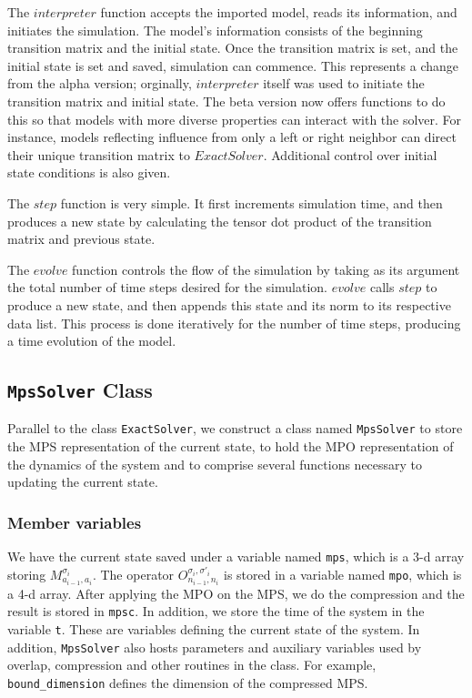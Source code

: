 \documentclass[english]{article}
\begin{document}
The $interpreter$ function accepts the imported model, reads its information, and initiates the simulation. The model's information consists of the beginning transition matrix and the initial state. Once the transition matrix is set, and the initial state is set and saved, simulation can commence. This represents a change from the alpha version; orginally, $interpreter$ itself was used to initiate the transition matrix and initial state. The beta version now offers functions to do this so that models with more diverse properties can interact with the solver. For instance, models reflecting influence from only a left or right neighbor can direct their unique transition matrix to $ExactSolver$. Additional control over initial state conditions is also given.

The $step$ function is very simple. It first increments simulation time, and then produces a new state by calculating the tensor dot product of the transition matrix and previous state.

The $evolve$ function controls the flow of the simulation by taking as its argument the total number of time steps desired for the simulation. $evolve$ calls $step$ to produce a new state, and then appends this state and its norm to its respective data list. This process is done iteratively for the number of time steps, producing a time evolution of the model. 


\subsection{\texttt{MpsSolver} Class}
Parallel to the class \texttt{ExactSolver}, we construct a class named \texttt{MpsSolver} to store the MPS representation of the current state, to hold the MPO representation of the dynamics of the system and to comprise several functions necessary to updating the current state. 
\subsubsection{Member variables}
We have the current state saved under a variable named \texttt{mps}, which is a 3-d array storing $M^{\sigma_i}_{a_{i-1},a_i}$. The operator $O^{\sigma_i, \sigma'_i}_{n_{i-1}, n_i}$ is stored in a variable named \texttt{mpo}, which is a 4-d array. After applying the MPO on the MPS, we do the compression and the result is stored in \texttt{mpsc}. In addition, we store the time of the system in the variable \texttt{t}. These are variables defining the current state of the system. In addition, \texttt{MpsSolver} also hosts parameters and auxiliary variables used by overlap, compression and other routines in the class. For example, \texttt{bound\_dimension} defines the dimension of the compressed MPS.
\end{document}
